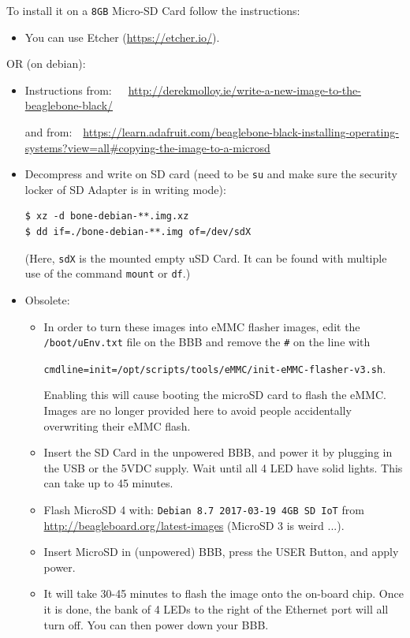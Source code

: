\documentclass[
	fontsize=10pt
	paper=a4
]{scrartcl}
\begin{document}
To install it on a \texttt{8GB} Micro-SD Card follow the instructions:

\begin{itemize}
\item You can use Etcher (\url{https://etcher.io/}).
\end{itemize}

OR (on debian):

\begin{itemize}
\item Instructions from:~~~\url{http://derekmolloy.ie/write-a-new-image-to-the-beaglebone-black/}

and from:~~\url{https://learn.adafruit.com/beaglebone-black-installing-operating-systems?view=all#copying-the-image-to-a-microsd}

\item Decompress and write on SD card (need to be \texttt{su} and make sure the security locker of SD Adapter is in writing mode):
\begin{lstlisting}
$ xz -d bone-debian-**.img.xz
$ dd if=./bone-debian-**.img of=/dev/sdX
\end{lstlisting}

(Here, \texttt{sdX} is the mounted empty uSD Card. It can be found with multiple use of the command \texttt{mount} or \texttt{df}.)


\item Obsolete:
\begin{footnotesize}
\begin{itemize}

\item In order to turn these images into eMMC flasher images, edit the \texttt{/boot/uEnv.txt} file on the BBB and remove the \texttt{\#} on the line with 

\texttt{cmdline=init=/opt/scripts/tools/eMMC/init-eMMC-flasher-v3.sh}. 

Enabling this will cause booting the microSD card to flash the eMMC. Images are no longer provided here to avoid people accidentally overwriting their eMMC flash.

\item Insert the SD Card in the unpowered BBB, and power it by plugging in the USB or the 5VDC supply. Wait until all 4 LED have solid lights. This can take up to 45 minutes. 


\item Flash MicroSD 4 with: \texttt{Debian 8.7 2017-03-19 4GB SD IoT} from \url{http://beagleboard.org/latest-images} (MicroSD 3 is weird ...).

\item Insert MicroSD in (unpowered) BBB, press the USER Button, and apply power.

\item It will take 30-45 minutes to flash the image onto the on-board chip. Once it is done, the bank of 4 LEDs to the right of the Ethernet port will all turn off. You can then power down your BBB.

\end{itemize}

\end{footnotesize}

\end{itemize}
\end{document}
